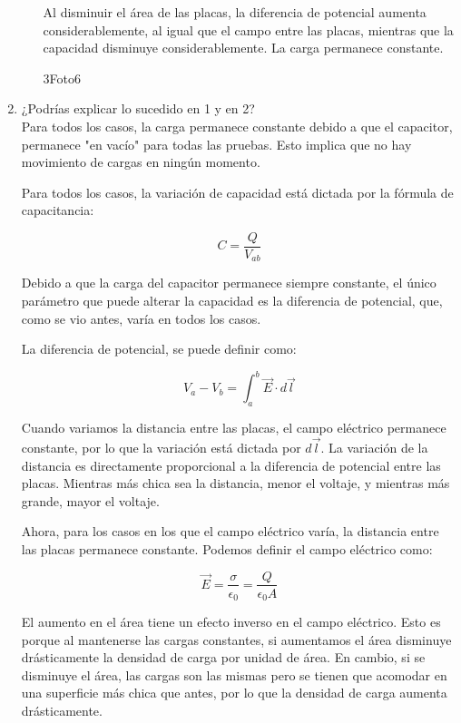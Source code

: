 \documentclass[12pt]{report}
\begin{document}
\begin{enumerate}
\begin{enumerate}
        Al disminuir el área de las placas, la diferencia de potencial aumenta considerablemente, al igual que el campo entre las placas, mientras que la capacidad disminuye considerablemente. La carga permanece constante.

        3Foto6
        \\
    \end{enumerate}
    \item ¿Podrías explicar lo sucedido en 1 y en 2?
    \\
    Para todos los casos, la carga permanece constante debido a que el capacitor, permanece "en vacío" para todas las pruebas. Esto implica que no hay movimiento de cargas en ningún momento.

    Para todos los casos, la variación de capacidad está dictada por la fórmula de capacitancia:

\[C=\frac{Q}{V_{ab}}\]

    Debido a que la carga del capacitor permanece siempre constante, el único parámetro que puede alterar la capacidad es la diferencia de potencial, que, como se vio antes, varía en todos los casos.
    
    La diferencia de potencial, se puede definir como:
    
\[V_a-V_b=\int_{a}^{b}\vec{E}\cdot d \vec{l}\]

    Cuando variamos la distancia entre las placas, el campo eléctrico permanece constante, por lo que la variación está dictada por \(d \vec{l}\). La variación de la distancia es directamente proporcional a la diferencia de potencial entre las placas. Mientras más chica sea la distancia, menor el voltaje, y mientras más grande, mayor el voltaje.

    Ahora, para los casos en los que el campo eléctrico varía, la distancia entre las placas permanece constante. Podemos definir el campo eléctrico como:
    
\[\vec{E}=\frac{\sigma}{\epsilon_0}=\frac{Q}{\epsilon_0 A}\]

    El aumento en el área tiene un efecto inverso en el campo eléctrico. Esto es porque al mantenerse las cargas constantes, si aumentamos el área disminuye drásticamente la densidad de carga por unidad de área. En cambio, si se disminuye el área, las cargas son las mismas pero se tienen que acomodar en una superficie más chica que antes, por lo que la densidad de carga aumenta drásticamente.

\end{enumerate}
\end{document}
